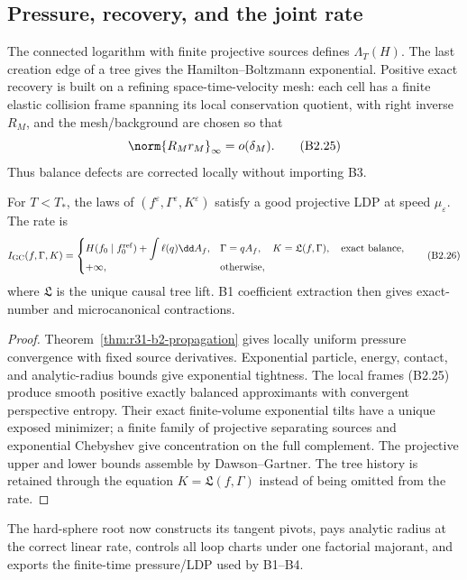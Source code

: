 \subsection{Pressure, recovery, and the joint rate}

The connected logarithm with finite projective sources defines
$\Lambda_T(H)$.  The last creation edge of a tree gives the
Hamilton--Boltzmann exponential.  Positive exact recovery is built on a
refining space-time-velocity mesh: each cell has a finite elastic collision
frame spanning its local conservation quotient, with right inverse $R_M$, and
the mesh/background are chosen so that
\[
 \norm{R_Mr_M}_\infty=o(\delta_M).                        \tag{B2.25}
\]
Thus balance defects are corrected locally without importing B3.

\begin{theorem}
\label{thm:r31-b2-ldp}
For $T<T_*$, the laws of
$(f^\varepsilon,\Gamma^\varepsilon,K^\varepsilon)$ satisfy a good projective
LDP at speed $\mu_\varepsilon$.  The rate is
\[
 I_{\rm GC}(f,\Gamma,K)=
 \begin{cases}
 H(f_0\mid f_0^{\rm ref})+
 \displaystyle\int\ell(q)\dd A_f,
 &\Gamma=qA_f,\quad K=\mathfrak L(f,\Gamma),\quad
   \text{exact balance},\\
 +\infty,&\text{otherwise},
 \end{cases}                                             \tag{B2.26}
\]
where $\mathfrak L$ is the unique causal tree lift.  B1 coefficient extraction
then gives exact-number and microcanonical contractions.
\end{theorem}

\begin{proof}
Theorem~\ref{thm:r31-b2-propagation} gives locally uniform pressure convergence
with fixed source derivatives.  Exponential particle, energy, contact, and
analytic-radius bounds give exponential tightness.  The local frames (B2.25)
produce smooth positive exactly balanced approximants with convergent
perspective entropy.  Their exact finite-volume exponential tilts have a
unique exposed minimizer; a finite family of projective separating sources
and exponential Chebyshev give concentration on the full complement.
The projective upper and lower bounds assemble by Dawson--Gartner.  The tree
history is retained through the equation $K=\mathfrak L(f,\Gamma)$ instead of
being omitted from the rate.
\end{proof}

The hard-sphere root now constructs its tangent pivots, pays analytic radius at
the correct linear rate, controls all loop charts under one factorial
majorant, and exports the finite-time pressure/LDP used by B1--B4.
